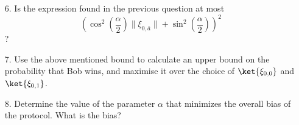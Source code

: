 \begin{exercises}
\begin{enumerate}
\item[6.] Is the expression found in the previous question at most $$(\cos^2(\frac{\alpha}{2}) \| \xi_{0, \bar{a}} \| + \sin^2(\frac{\alpha}{2}) )^2$$?
\item[7.] Use the above mentioned bound to calculate an upper bound on the probability that Bob wins, and maximise it over the choice of $\ket{\xi_{0,0}}$ and $\ket{\xi_{0,1}}$.
\item[8.] Determine the value of the parameter $\alpha$ that minimizes the overall bias of the protocol. What is the bias?
\end{enumerate}


\end{exercises}
